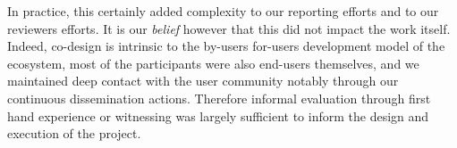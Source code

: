 In practice, this certainly added complexity to our reporting efforts
and to our reviewers efforts. It is our \emph{belief} however that
this did not impact the work itself. Indeed, co-design is intrinsic to
the by-users for-users development model of the ecosystem, most of the
participants were also end-users themselves, and we maintained deep
contact with the user community notably through our continuous
dissemination actions. Therefore informal evaluation through first
hand experience or witnessing was largely sufficient to inform the
design and execution of the project.

